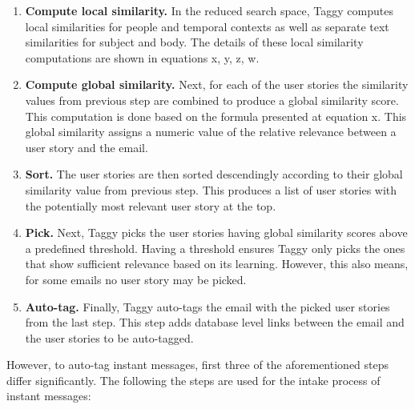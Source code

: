 \begin{enumerate}
	\item \textbf{Compute local similarity.} In the reduced search space, Taggy computes local similarities for people and temporal contexts as well as separate text similarities for subject and body. The details of these local similarity computations are shown in equations x, y, z, w. 
	
	\item \textbf{Compute global similarity.} Next, for each of the user stories the similarity values from previous step are combined to produce a global similarity score. This computation is done based on the formula presented at equation x. This global similarity assigns a numeric value of the relative relevance between a user story and the email.
	
	\item \textbf{Sort.} The user stories are then sorted descendingly according to their global similarity value from previous step. This produces a list of user stories with the potentially most relevant user story at the top.
	
	\item \textbf{Pick.} Next, Taggy picks the user stories having global similarity scores above a predefined threshold. Having a threshold ensures Taggy only picks the ones that show sufficient relevance based on its learning. However, this also means, for some emails no user story may be picked.
	
	\item \textbf{Auto-tag.}	Finally, Taggy auto-tags the email with the picked user stories from the last step. This step adds database level links between the email and the user stories to be auto-tagged.
\end{enumerate}

However, to auto-tag instant messages, first three of the aforementioned steps differ significantly. The following the steps are used for the intake process of instant messages:

